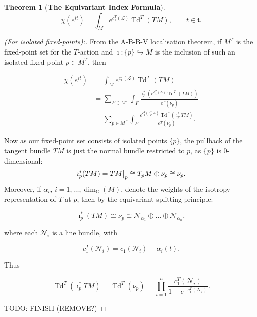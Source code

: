 \documentclass{article}
\newtheorem{theorem}{Theorem}[section]
\newcommand{\CC}{\mathbb{C}}
\newcommand{\mcL}{\mathcal{L}}
\newcommand{\mft}{\mathfrak{t}}
\newcommand{\mc}[1]{\mathcal{#1}}
\DeclareMathOperator{\Td}{Td}
\newcommand\restr[2]{{%
		\left.\kern-\nulldelimiterspace %
		#1 %
		\vphantom{\big|} %
		\right|_{#2} %
}}
\begin{document}
\begin{theorem}[\textbf{The Equivariant Index Formula}]
	\begin{equation*}
		\chi(e^{it}) = \int_{M} e^{c_{1}^{T}(\mcL)} \Td^{T}(TM), \qquad t \in \mft.
	\end{equation*}
\end{theorem}

\begin{proof}[(For isolated fixed-points):]
	From the A-B-B-V localisation theorem, if $M^{T}$ is the fixed-point set for the $T$-action and $\imath : \{p\} \hookrightarrow M$ is the inclusion of such an isolated fixed-point $p \in M^{T}$, then
	
	\begin{equation*}
		\begin{split}
			\chi(e^{it}) &= \int_{M} e^{c_{1}^{T}(\mcL)} \Td^{T}(TM) \\
			&= \sum\limits_{F \in M^{T}} \int_{F} \frac{ \imath_{p}^{\ast}\left( e^{c_{1}^{T}(\mcL)} \Td^{T}(TM) \right)}{e^{T}(\nu_{p})} \\
			&= \sum\limits_{p \in M^{T}} \int_{F} \frac{e^{c_{1}^{T}(\imath_{p}^{\ast}\mcL)} \Td^{T}(\imath_{p}^{\ast}TM)}{e^{T}(\nu_{p})}.
		\end{split}
	\end{equation*}
	
	Now as our fixed-point set consists of isolated points $\{p\}$, the pullback of the tangent bundle $TM$ is just the normal bundle restricted to $p$, as $\{p\}$ is 0-dimensional:	
	\begin{equation*}
		\imath_{p}^{\ast}(TM) = \restr{TM}{p} \cong T_{p}M \oplus \nu_{p} \cong \nu_{p}.
	\end{equation*}
	Moreover, if $\alpha_{i}$, $i = 1, \ldots, \dim_{\CC}(M)$, denote the weights of the isotropy representation of $T$ at $p$, then by the equivariant splitting principle:
	
	\begin{equation*}
		\imath_{p}^{\ast}(TM) \cong \nu_{p} \cong \mc{N}_{\alpha_{1}} \oplus \ldots \oplus \mc{N}_{\alpha_{n}},
	\end{equation*}

	where each $\mc{N}_{i}$ is a line bundle, with
	
	\begin{equation*}
		c_{1}^{T}(\mc{N}_{i}) = c_{1}(\mc{N}_{i}) - \alpha_{i}(t).
	\end{equation*}
	
	Thus
	
	\begin{equation*}
		\Td^{T}(\imath_{p}^{\ast}TM) = \Td^{T}(\nu_{p}) = \prod_{i = 1}^{n} \frac{c_{1}^{T}(\mc{N}_{i})}{1 - e^{-c_{1}^{T}(\mc{N}_{i})} }.
	\end{equation*}
	
	TODO: FINISH (REMOVE?)
\end{proof}
\end{document}
